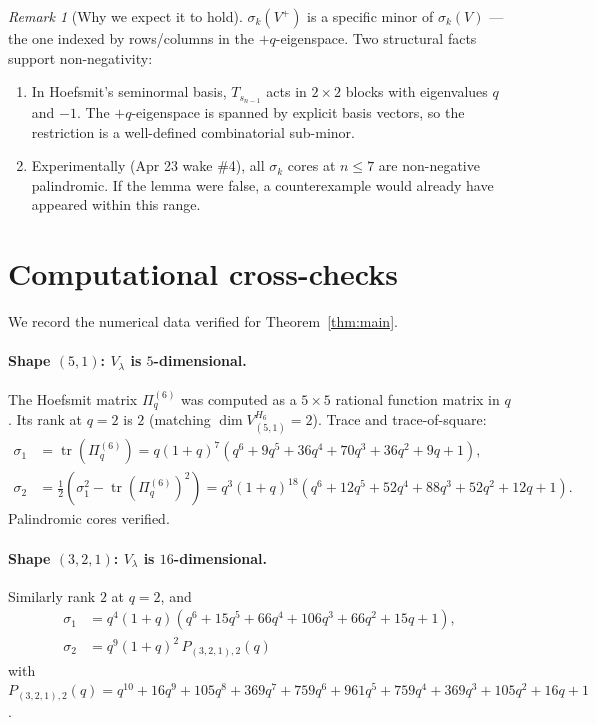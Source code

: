 \documentclass[11pt]{article}
\theoremstyle{plain}
\theoremstyle{definition}
\theoremstyle{remark}
\newtheorem{remark}[theorem]{Remark}
\newcommand{\Pibs}{\Pi_q}
\newcommand{\trace}{\operatorname{tr}}
\begin{document}
\begin{remark}[Why we expect it to hold]\label{rem:why-expect}
$\sigma_k(V^+)$ is a specific minor of $\sigma_k(V)$ --- the one indexed by
rows/columns in the $+q$-eigenspace. Two structural facts support
non-negativity:
\begin{enumerate}
\item In Hoefsmit's seminormal basis, $T_{s_{n-1}}$ acts in $2\times 2$
blocks with eigenvalues $q$ and $-1$. The $+q$-eigenspace is spanned by
explicit basis vectors, so the restriction is a well-defined combinatorial
sub-minor.
\item Experimentally (Apr 23 wake \#4), all $\sigma_k$ cores at $n \leq 7$
are non-negative palindromic. If the lemma were false, a counterexample
would already have appeared within this range.
\end{enumerate}
\end{remark}

\section{Computational cross-checks}

We record the numerical data verified for Theorem~\ref{thm:main}.

\paragraph{Shape $(5,1)$: $V_\lambda$ is $5$-dimensional.} The
Hoefsmit matrix $\Pibs^{(6)}$ was computed as a $5 \times 5$ rational
function matrix in $q$. Its rank at $q = 2$ is $2$ (matching
$\dim V_{(5,1)}^{H_6} = 2$). Trace and trace-of-square:
\begin{align*}
\sigma_1 &= \trace(\Pibs^{(6)}) = q(1+q)^7(q^6 + 9q^5 + 36q^4 + 70q^3 + 36q^2 + 9q + 1), \\
\sigma_2 &= \tfrac12(\sigma_1^2 - \trace(\Pibs^{(6)})^2) = q^3(1+q)^{18}(q^6 + 12q^5 + 52q^4 + 88q^3 + 52q^2 + 12q + 1).
\end{align*}
Palindromic cores verified.

\paragraph{Shape $(3,2,1)$: $V_\lambda$ is $16$-dimensional.}
Similarly rank $2$ at $q=2$, and
\begin{align*}
\sigma_1 &= q^4(1+q)(q^6 + 15q^5 + 66q^4 + 106q^3 + 66q^2 + 15q + 1), \\
\sigma_2 &= q^9(1+q)^2\, P_{(3,2,1),2}(q)
\end{align*}
with $P_{(3,2,1),2}(q) = q^{10} + 16q^9 + 105q^8 + 369q^7 + 759q^6 + 961q^5 + 759q^4 + 369q^3 + 105q^2 + 16q + 1$.
\end{document}
